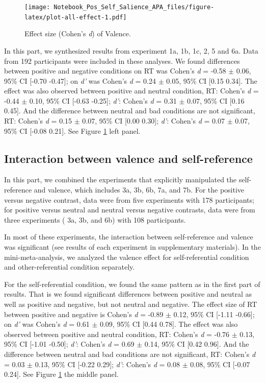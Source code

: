 \documentclass[
  english,
  man]{apa6}
\begin{document}
\begin{figure}
\centering
\texttt{[image: Notebook\_Pos\_Self\_Salience\_APA\_files/figure-latex/plot-all-effect-1.pdf]}
\caption{\label{fig:plot-all-effect}Effect size (Cohen's \emph{d}) of Valence.}
\end{figure}

In this part, we synthesized results from experiment 1a, 1b, 1c, 2, 5 and 6a. Data from 192 participants were included in these analyses. We found differences between positive and negative conditions on RT was Cohen's \emph{d} = -0.58 \(\pm\) 0.06, 95\% CI {[}-0.70 -0.47{]}; on \emph{d'} was Cohen's \emph{d} = 0.24 \(\pm\) 0.05, 95\% CI {[}0.15 0.34{]}. The effect was also observed between positive and neutral condition, RT: Cohen's \emph{d} = -0.44 \(\pm\) 0.10, 95\% CI {[}-0.63 -0.25{]}; \emph{d'}: Cohen's \emph{d} = 0.31 \(\pm\) 0.07, 95\% CI {[}0.16 0.45{]}. And the difference between neutral and bad conditions are not significant, RT: Cohen's \emph{d} = 0.15 \(\pm\) 0.07, 95\% CI {[}0.00 0.30{]}; \emph{d'}: Cohen's \emph{d} = 0.07 \(\pm\) 0.07, 95\% CI {[}-0.08 0.21{]}. See Figure \ref{fig:plot-all-effect} left panel.

\hypertarget{interaction-between-valence-and-self-reference}{%
\subsection{Interaction between valence and self-reference}\label{interaction-between-valence-and-self-reference}}

In this part, we combined the experiments that explicitly manipulated the self-reference and valence, which includes 3a, 3b, 6b, 7a, and 7b. For the positive versus negative contrast, data were from five experiments with 178 participants; for positive versus neutral and neutral versus negative contrasts, data were from three experiments ( 3a, 3b, and 6b) with 108 participants.

In most of these experiments, the interaction between self-reference and valence was significant (see results of each experiment in supplementary materials). In the mini-meta-analysis, we analyzed the valence effect for self-referential condition and other-referential condition separately.

For the self-referential condition, we found the same pattern as in the first part of results. That is we found significant differences between positive and neutral as well as positive and negative, but not neutral and negative. The effect size of RT between positive and negative is Cohen's \emph{d} = -0.89 \(\pm\) 0.12, 95\% CI {[}-1.11 -0.66{]}; on \emph{d'} was Cohen's \emph{d} = 0.61 \(\pm\) 0.09, 95\% CI {[}0.44 0.78{]}. The effect was also observed between positive and neutral condition, RT: Cohen's \emph{d} = -0.76 \(\pm\) 0.13, 95\% CI {[}-1.01 -0.50{]}; \emph{d'}: Cohen's \emph{d} = 0.69 \(\pm\) 0.14, 95\% CI {[}0.42 0.96{]}. And the difference between neutral and bad conditions are not significant, RT: Cohen's \emph{d} = 0.03 \(\pm\) 0.13, 95\% CI {[}-0.22 0.29{]}; \emph{d'}: Cohen's \emph{d} = 0.08 \(\pm\) 0.08, 95\% CI {[}-0.07 0.24{]}. See Figure \ref{fig:plot-all-effect} the middle panel.
\end{document}
